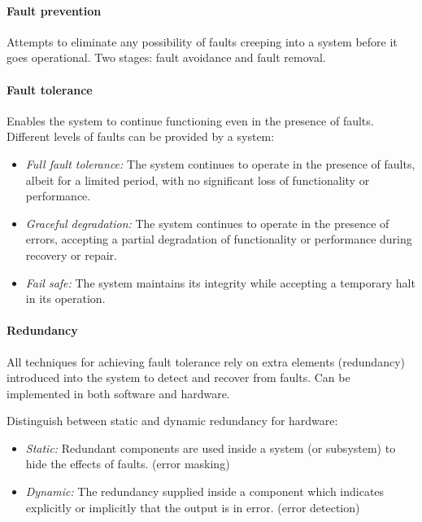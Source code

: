 
\paragraph{Fault prevention} Attempts to eliminate any possibility of faults creeping into a system before it goes operational. Two stages: fault avoidance and fault removal.

\paragraph{Fault tolerance} Enables the system to continue functioning even in the presence of faults. Different levels of faults can be provided by a system:
\begin{itemize}[nolistsep,noitemsep]
  \item \textit{Full fault tolerance:} The system continues to operate in the presence of faults, albeit for a limited period, with no significant loss of functionality or performance.
  \item \textit{Graceful degradation:} The system continues to operate in the presence of errors, accepting a partial degradation of functionality or performance during recovery or repair.
  \item \textit{Fail safe:} The system maintains its integrity while accepting a temporary halt in its operation.
\end{itemize}

\paragraph{Redundancy} All techniques for achieving fault tolerance rely on extra elements (redundancy) introduced into the system to detect and recover from faults. Can be implemented in both software and hardware.

Distinguish between static and dynamic redundancy for hardware:
\begin{itemize}[nolistsep,noitemsep]
  \item \textit{Static:} Redundant components are used inside a system (or subsystem) to hide the effects of faults. (error masking)
  \item \textit{Dynamic:} The redundancy supplied inside a component which indicates explicitly or implicitly that the output is in error. (error detection)
\end{itemize}


